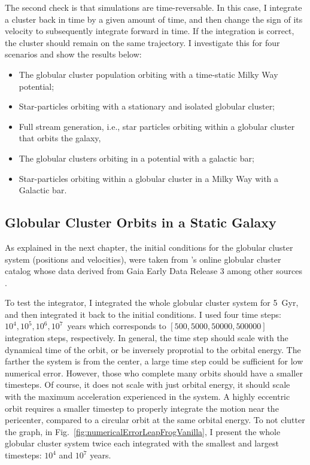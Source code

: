     The second check is that simulations are time-reversable. In this case, I integrate a cluster back in time by a given amount of time, and then change the sign of its velocity to subsequently integrate forward in time. If the integration is correct, the cluster should remain on the same trajectory. I investigate this for four scenarios and show the results below: 
    \begin{itemize}
        \item The globular cluster population orbiting with a time-static Milky Way potential;
        \item Star-particles orbiting with a stationary and isolated globular cluster;
        \item Full stream generation, i.e., star particles orbiting within a globular cluster that orbits the galaxy,
        \item The globular clusters orbiting in a potential with a galactic bar; 
        \item Star-particles orbiting within a globular cluster in a Milky Way with a Galactic bar.
    \end{itemize}

    \subsection{Globular Cluster Orbits in a Static Galaxy}

        As explained in the next chapter, the initial conditions for the globular cluster system (positions and velocities), were taken from \citet{2018MNRAS.478.1520B}'s online globular cluster catalog whose data derived from Gaia Early Data Release 3 among other sources \citep{2021MNRAS.505.5957B,2021A&A...649A...1G,2023A&A...674A...1G}. 

        To test the integrator, I integrated the whole globular cluster system for 5~Gyr, and then integrated it back to the initial conditions. I used four time steps: $10^4,10^5,10^6,10^7$~years which corresponds to $\left[500,5000,50000,500000\right]$ integration steps, respectively. In general, the time step should scale with the dynamical time of the orbit, or be inversely proprotial to the orbital energy. The farther the system is from the center, a large time step could be sufficient for low numerical error. However, those who complete many orbits should have a smaller timesteps. Of course, it does not scale with just orbital energy, it should scale with the maximum acceleration experienced in the system. A highly eccentric orbit requires a smaller timestep to properly integrate the motion near the pericenter, compared to a circular orbit at the same orbital energy. To not clutter the graph, in Fig.~\ref{fig:numericalErrorLeapFrogVanilla}, I present the whole globular cluster system twice each integrated with the smallest and largest timesteps: $10^4$ and $10^7$ years. 

